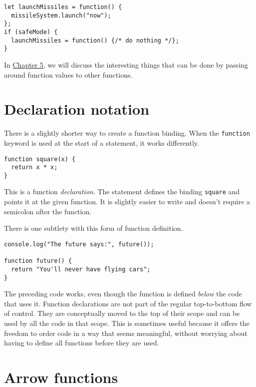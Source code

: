 \begin{lstlisting}
let launchMissiles = function() {
  missileSystem.launch("now");
};
if (safeMode) {
  launchMissiles = function() {/* do nothing */};
}
\end{lstlisting}
\noindent{}

In \hyperref[higher_order]{Chapter 5}, we will discuss the interesting things that can be done by passing around function values to other functions.

\section{Declaration notation}

There is a slightly shorter way to create a function binding. When the \lstinline`function` keyword is used at the start of a statement, it works differently.

\begin{lstlisting}
function square(x) {
  return x * x;
}
\end{lstlisting}
\noindent{}

This is a function \emph{declaration}. The statement defines the binding \lstinline`square` and points it at the given function. It is slightly easier to write and doesn't require a semicolon after the function.

There is one subtlety with this form of function definition.

\begin{lstlisting}
console.log("The future says:", future());

function future() {
  return "You'll never have flying cars";
}
\end{lstlisting}
\noindent

The preceding code works, even though the function is defined \emph{below} the code that uses it. Function declarations are not part of the regular top-to-bottom flow of control. They are conceptually moved to the top of their scope and can be used by all the code in that scope. This is sometimes useful because it offers the freedom to order code in a way that seems meaningful, without worrying about having to define all functions before they are used.

\section{Arrow functions}

